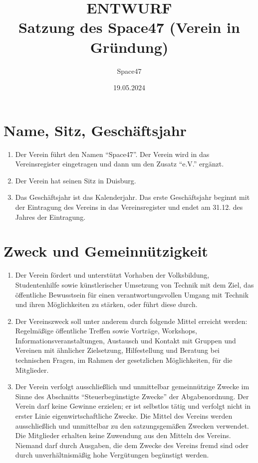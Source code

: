 \documentclass[a4paper]{article}
\title{ENTWURF \protect\\ Satzung des Space47 (Verein in Gründung)}
\author{Space47}
\date{19.05.2024}
\begin{document}
\maketitle

\section{Name, Sitz, Geschäftsjahr}
\begin{enumerate}
    \item Der Verein führt den Namen \enquote{Space47}. Der Verein wird in das Vereinsregister eingetragen und dann um den Zusatz \enquote{e.V.} ergänzt.
    \item Der Verein hat seinen Sitz in Duisburg.
    \item Das Geschäftsjahr ist das Kalenderjahr. Das erste Geschäftsjahr beginnt mit der Eintragung des Vereins in das Vereinsregister und endet am 31.12. des Jahres der Eintragung.
\end{enumerate}

\section{Zweck und Gemeinnützigkeit}
\begin{enumerate}
    \item Der Verein fördert und unterstützt Vorhaben der Volksbildung, Studentenhilfe sowie künstlerischer Umsetzung von Technik mit dem Ziel, das öffentliche Bewusstsein für einen verantwortungsvollen Umgang mit Technik und ihren Möglichkeiten zu stärken, oder führt diese durch.
    \item Der Vereinszweck soll unter anderem durch folgende Mittel erreicht werden: Regelmäßige öffentliche Treffen sowie Vorträge, Workshops, Informationsveranstaltungen, Austausch und Kontakt mit Gruppen und Vereinen mit ähnlicher Zielsetzung, Hilfestellung und Beratung bei technischen Fragen, im Rahmen der gesetzlichen Möglichkeiten, für die Mitglieder.
    \item Der Verein verfolgt ausschließlich und unmittelbar gemeinnützige Zwecke im Sinne des Abschnitts \enquote{Steuerbegünstigte Zwecke} der Abgabenordnung. Der Verein darf keine Gewinne erzielen; er ist selbstlos tätig und verfolgt nicht in erster Linie eigenwirtschaftliche Zwecke. Die Mittel des Vereins werden ausschließlich und unmittelbar zu den satzungsgemäßen Zwecken verwendet. Die Mitglieder erhalten keine Zuwendung aus den Mitteln des Vereins. Niemand darf durch Ausgaben, die dem Zwecke des Vereins fremd sind oder durch unverhältnismäßig hohe Vergütungen begünstigt werden.
\end{enumerate}
\end{document}
